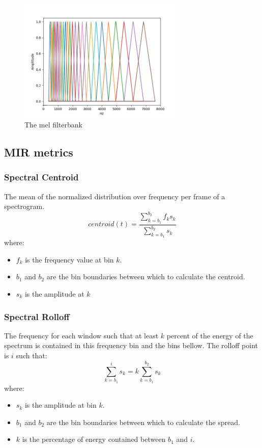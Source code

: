 \documentclass[a4paper, 12pt, twoside]{report}
\begin{document}
\begin{figure}[H]
\centering
\includegraphics[width=0.7\textwidth]{./Figures/mel_filterbank.png}
\caption{\label{fig:mel_filterbank}The mel filterbank}
\end{figure}

\subsection{MIR metrics} \label{mir}
\label{sec:org59595af}
\subsubsection{Spectral Centroid}
\label{sec:org722ed3e}

    The mean of the normalized distribution over frequency per frame of a spectrogram.
    \[ centroid(t) = \frac{\sum^{b_{2}}_{k=b_{1}}f_{k}s_{k}}{\sum^{b_{2}}_{k=b_{1}}s_{k}} \]
    where:
    \begin{itemize}
      \item $f_{k}$ is the frequency value at bin $k$.
      \item $b_{1}$ and $b_{2}$ are the bin boundaries between which to calculate the centroid.
      \item $s_{k}$ is the amplitude at $k$
    \end{itemize}

\subsubsection{Spectral Rolloff}
\label{sec:org8ba1512}

    The frequency for each window such that at least $k$ percent of the energy of the spectrum is contained in this frequency bin and the bins bellow. The rolloff point is $i$ such that:
    \[ \sum^{i}_{k=b_{1}}s_{k} = k\sum^{b_{2}}_{k=b_{1}}s_{k} \]
    where:
    \begin{itemize}
      \item $s_{k}$ is the amplitude at bin $k$.
      \item $b_{1}$ and $b_{2}$ are the bin boundaries between which to calculate the spread.
      \item $k$ is the percentage of energy contained between $b_{1}$ and $i$.
    \end{itemize}
\end{document}
